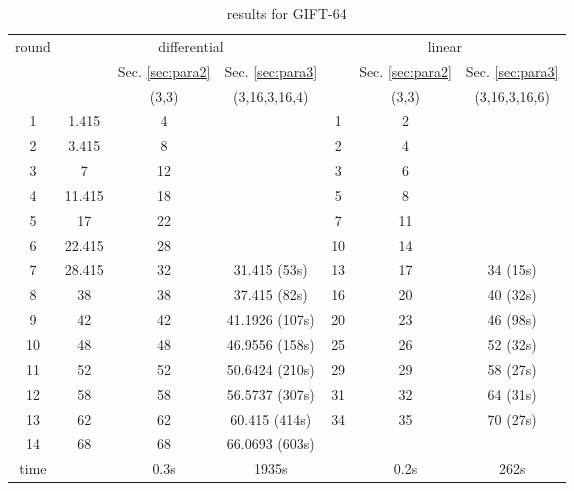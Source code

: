\begin{table}
	\caption{results for GIFT-64}\label{tab:gift64}
	\centering
	\begin{tabular}{|c|c|c|c|c|c|c|}
		\hline
		\multirow{3}{*}{round}&\multicolumn{3}{|c|}{differential}&\multicolumn{3}{|c|}{linear}\\
        \cline{2-7}
		&\multirow{2}{*}{\cite{ZZDX19}}&Sec. \ref{sec:para2}&Sec. \ref{sec:para3}&\multirow{2}{*}{\cite{ZZDX19}}&Sec. \ref{sec:para2}&Sec. \ref{sec:para3}\\
		\cline{3-4}\cline{6-7}
		&&(3,3)&(3,16,3,16,4)&&(3,3)&(3,16,3,16,6)\\
        \hline
		1&	1.415&	4&	& 			1&	2&	\\
		2&	3.415&	8&	& 			2&	4&	\\
		3&	7&		12&	& 			3&	6&	\\
		4&	11.415&	18&	& 			5&	8&	\\
		5&	17&		22&	& 			7&	11&	\\
		6&	22.415&	28&	& 			10&	14&	\\
		7&	28.415&	32&	31.415 (53s)&		13&	17&	34 (15s)\\
		8&	38&		38&	37.415 (82s)&		16&	20&	40 (32s)\\
		9&	42&		42&	41.1926 (107s)&	20&	23&	46 (98s)\\
		10&	48&		48&	46.9556 (158s)& 	25&	26&	52 (32s)\\
		11&	52&		52&	50.6424 (210s)& 	29&	29&	58 (27s)\\
		12&	58&		58&	56.5737 (307s)& 	31&	32&	64 (31s)\\
		13&	62&		62&	60.415 (414s)&		34&	35&	70 (27s)\\
		14&	68&		68&	66.0693 (603s)& 	&	&	\\
		\hline
		time&&0.3s&1935s&&0.2s&262s\\
		\hline
	\end{tabular}
\end{table}


